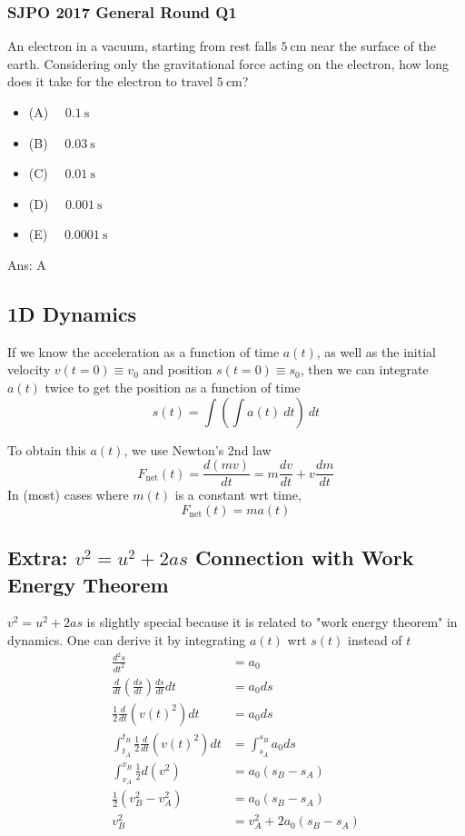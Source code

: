 \documentclass{article}
\begin{document}
\begin{samepage}
\subsubsection{SJPO 2017 General Round Q1} 
An electron in a vacuum, starting from rest falls $5 \mathrm{~cm}$ near the surface of the earth. Considering only the gravitational force acting on the electron, how long does it take for the electron to travel $5 \mathrm{~cm}$?
\begin{itemize}
\item[] (A) $\quad 0.1 \mathrm{~s}$
\item[] (B) $\quad 0.03 \mathrm{~s}$
\item[] (C) $\quad 0.01 \mathrm{~s}$
\item[] (D) $\quad 0.001 \mathrm{~s}$
\item[] (E) $\quad 0.0001 \mathrm{~s}$
\end{itemize}
Ans: \ifpaper A \fi
\end{samepage}

\subsection{1D Dynamics}
If we know the acceleration as a function of time $a(t)$, as well as the initial velocity $v(t=0) \equiv v_0$ and position $s(t=0) \equiv s_0$, then we can integrate $a(t)$ twice to get the position as a function of time 
$$s(t) = \int \left(\int a(t)\ dt\right)\ dt$$

To obtain this $a(t)$, we use Newton's 2nd law 
$$F_{\text{net}}(t) = \frac{d(mv)}{dt} = m \frac{dv}{dt} + v \frac{dm}{dt}$$
In (most) cases where $m(t)$ is a constant wrt time, 
$$F_{\text{net}}(t) = ma(t)$$



\subsection{Extra: $v^2 = u^2 + 2as$ Connection with Work Energy Theorem}
$v^2 = u^2 + 2as$ is slightly special because it is related to "work energy theorem" in dynamics. One can derive it by integrating $a(t)$ wrt $s(t)$ instead of $t$ 
\begin{align}
    \frac{d^2 s}{dt^2} &= a_0 \\
    \frac{d}{dt} \left(\frac{ds}{dt}\right) \frac{ds}{dt} dt &= a_0 ds \\
    \frac{1}{2} \frac{d}{dt} \left( v(t)^2 \right) dt &= a_0 ds \\
    \int_{t_A}^{t_B} \frac{1}{2} \frac{d}{dt} \left( v(t)^2 \right) dt &= \int_{s_A}^{s_B} a_0 ds \\
    \int_{v_A}^{v_B} \frac{1}{2} d\left( v^2 \right) &= a_0 (s_B - s_A) \\
    \frac{1}{2} (v_B^2 - v_A^2) &= a_0 (s_B - s_A) \\
    v_B^2 &= v_A^2 + 2a_0(s_B - s_A)
\end{align}
\end{document}
